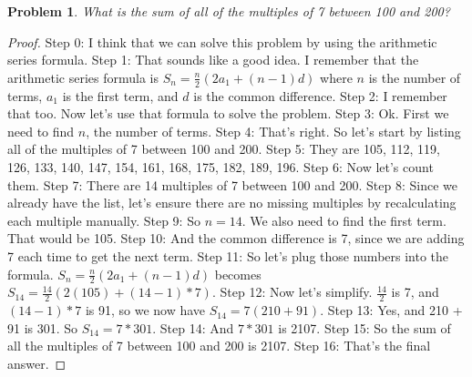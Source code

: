 \documentclass{article}
\newtheorem{theorem}{Problem}
\begin{document}
\begin{theorem}
What is the sum of all of the multiples of 7 between 100 and 200?
\end{theorem}

\begin{proof}
Step 0: I think that we can solve this problem by using the arithmetic series formula.
Step 1: That sounds like a good idea. I remember that the arithmetic series formula is $S_n = \frac{n}{2}(2a_1 + (n-1)d)$ where $n$ is the number of terms, $a_1$ is the first term, and $d$ is the common difference.
Step 2: I remember that too. Now let's use that formula to solve the problem.
Step 3: Ok. First we need to find $n$, the number of terms.
Step 4: That's right. So let's start by listing all of the multiples of 7 between 100 and 200.
Step 5: They are 105, 112, 119, 126, 133, 140, 147, 154, 161, 168, 175, 182, 189, 196.
Step 6: Now let's count them.
Step 7: There are 14 multiples of 7 between 100 and 200.
Step 8: Since we already have the list, let's ensure there are no missing multiples by recalculating each multiple manually.
Step 9: So $n = 14$. We also need to find the first term. That would be 105.
Step 10: And the common difference is 7, since we are adding 7 each time to get the next term.
Step 11: So let's plug those numbers into the formula. $S_n = \frac{n}{2}(2a_1 + (n-1)d)$ becomes $S_{14} = \frac{14}{2}(2(105) + (14-1)*7)$.
Step 12: Now let's simplify. $\frac{14}{2}$ is 7, and $(14-1)*7$ is 91, so we now have $S_{14} = 7(210 + 91)$.
Step 13: Yes, and 210 + 91 is 301. So $S_{14} = 7 * 301$.
Step 14: And $7 * 301$ is 2107.
Step 15: So the sum of all the multiples of 7 between 100 and 200 is 2107.
Step 16: That's the final answer.
\end{proof}
\end{document}
